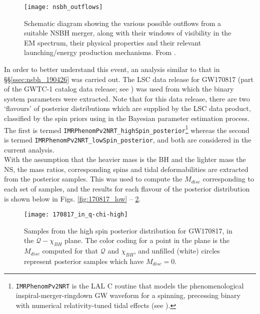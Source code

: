         \begin{figure}[H]
            \centering
            \texttt{[image: nsbh\_outflows]}
            \caption[EM outflows from NSBH mergers, from \cite{barbieri_2019a}]
            {
                Schematic diagram showing the various possible outflows from a suitable
                NSBH merger, along with their windows of visibility in the EM spectrum,
                their physical properties and their relevant launching/energy production
                mechanisms. From \cite{barbieri_2019a}.
            }
            \label{fig:nsbh_outflows}
        \end{figure}

        In order to better understand this event, an analysis similar to that in
        \S\S\ref{ssec:nsbh_190426} was carried out. The LSC data release for GW170817
        (part of the GWTC-1 catalog data release; see \cite{gwtc1_DR}) was used from
        which the binary system parameters were extracted. Note that for this data
        release, there are two `flavours' of posterior distributions which are supplied
        by the LSC data product, classified by the spin priors using in the Bayesian
        parameter estimation process.  The first is termed
        \texttt{IMRPhenomPv2NRT\_highSpin\_posterior}\footnote
        {
            \texttt{IMRPhenomPv2NRT} is the LAL C routine that models the
            phenomenological inspiral-merger-ringdown GW waveform for a spinning,
            precessing binary with numerical relativity-tuned tidal effects (see
            \cite{lalsuite}).
        }
        whereas the second is termed \texttt{IMRPhenomPv2NRT\_lowSpin\_posterior}, and
        both are considered in the current analysis.\\
        With the assumption that the heavier mass is the BH and the lighter mass the
        NS, the mass ratios, corresponding spins and tidal deformabilities are extracted
        from the posterior samples.  This was used to compute the $M_{disc}$
        corresponding to each set of samples, and the results for each flavour of
        the posterior distribution is shown below in Figs. \ref{fig:170817_low} --
        \ref{fig:170817_high}.

        \begin{figure}[ht]
            \centering
            \texttt{[image: 170817\_in\_q-chi-high]}
            \caption[$M_{disc}$ for GW170817's High Spin Posterior Distribution]
            {
                Samples from the high spin posterior distribution for GW170817, in the
                $\mathcal{Q}-\chi_{BH}$ plane. The color coding for a point in the plane
                is the $M_{disc}$ computed for that $\mathcal{Q}$ and $\chi_{BH}$, and
                unfilled (white) circles represent posterior samples which have
                $M_{disc} = 0$.
            }
            \label{fig:170817_high}
        \end{figure}

